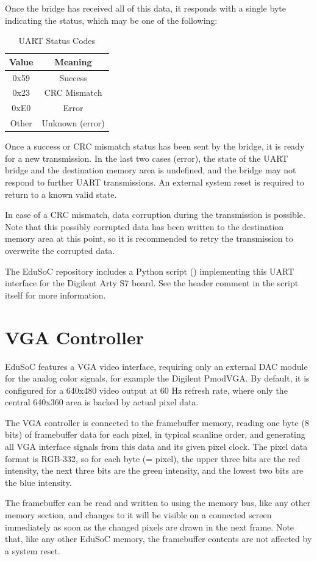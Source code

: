 Once the bridge has received all of this data, it responds with a single byte indicating the status, which may be one of the following:\\
\begin{table}[H]
    \centering
    \begin{tabular}{|c|c|}\hline
        Value & Meaning \\\hline\hline
        0x59 & Success \\
        0x23 & CRC Mismatch \\
        0xE0 & Error \\
        Other & Unknown (error) \\\hline
    \end{tabular}
    \caption{UART Status Codes}
    \label{tab:uart_status}
\end{table}
Once a success or CRC mismatch status has been sent by the bridge, it is ready for a new transmission.
In the last two cases (error), the state of the UART bridge and the destination memory area is undefined, and the bridge may not respond to further UART transmissions. An external system reset is required to return to a known valid state.

In case of a CRC mismatch, data corruption during the transmission is possible. Note that this possibly corrupted data has been written to the destination memory area at this point, so it is recommended to retry the transmission to overwrite the corrupted data.

The EduSoC repository includes a Python script () implementing this UART interface for the Digilent Arty S7 board. See the header comment in the script itself for more information.

\section{VGA Controller}\label{sec:vga}
EduSoC features a VGA video interface, requiring only an external DAC module for the analog color signals, for example the Digilent PmodVGA.
By default, it is configured for a 640x480 video output at 60 Hz refresh rate, where only the central 640x360 area is backed by actual pixel data.

The VGA controller is connected to the framebuffer memory, reading one byte (8 bits) of framebuffer data for each pixel, in typical scanline order, and generating all VGA interface signals from this data and its given pixel clock.
The pixel data format is RGB-332, so for each byte (= pixel), the upper three bits are the red intensity, the next three bits are the green intensity, and the lowest two bits are the blue intensity.

The framebuffer can be read and written to using the memory bus, like any other memory section, and changes to it will be visible on a connected screen immediately as soon as the changed pixels are drawn in the next frame. Note that, like any other EduSoC memory, the framebuffer contents are not affected by a system reset.